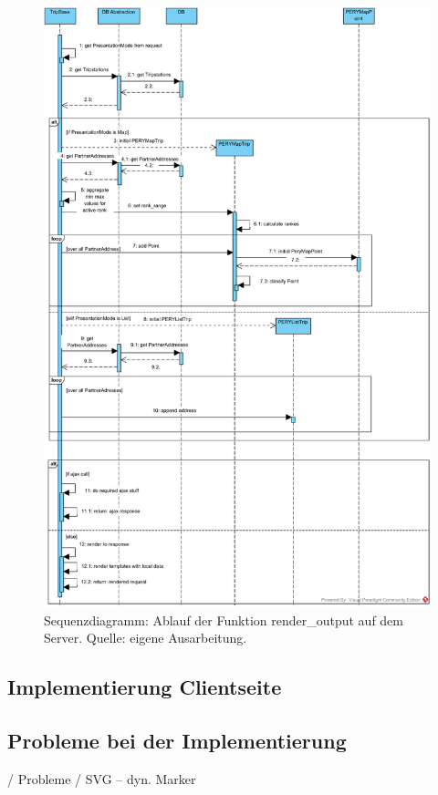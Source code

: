 \documentclass[Bachelorarbeit.tex]{subfiles}
\begin{document}
\begin{figure}[h]
\centering
\includegraphics[width=1\linewidth]{img/Implementierung/renderOutput}
\caption[k]{Sequenzdiagramm: Ablauf der Funktion render\_output auf dem Server. Quelle: eigene Ausarbeitung.}
\label{fig:renderOutput}
\end{figure}

\subsection{Implementierung Clientseite}

\subsection{Probleme bei der Implementierung}
/ Probleme
/ SVG -- dyn. Marker
\end{document}
